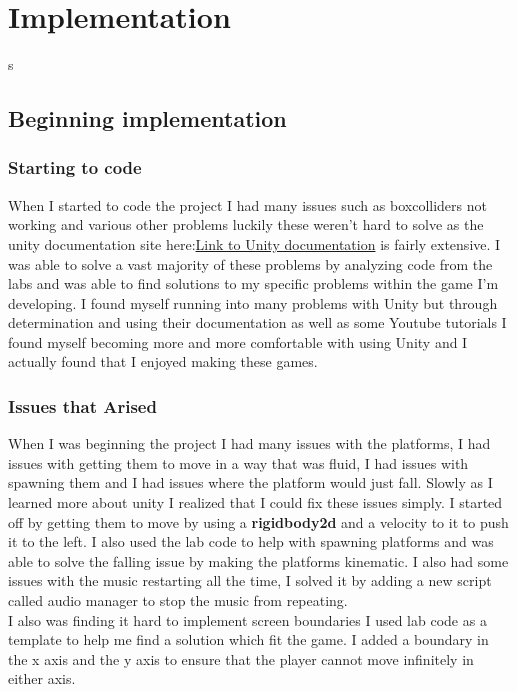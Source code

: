 \documentclass{report}
\begin{document}
\chapter{Implementation}s
\section{Beginning implementation}
\subsection{Starting to code}
When I started to code the project I had many issues such as boxcolliders not working and various other problems luckily these weren't  hard to solve as the unity documentation site here:\href{https://docs.unity3d.com/Manual/index.html}{Link to Unity documentation} is fairly extensive.  I was able to solve a vast majority of these problems by analyzing code from the labs and was able to find solutions to my specific problems within the game I'm developing.  I found myself running into many problems with Unity but through determination and using their documentation as well as some Youtube tutorials I found myself becoming more and more comfortable with using Unity and I actually found that I enjoyed making these games.
\subsection{Issues that Arised}
When I was beginning the project I had many issues with the platforms, I had issues with getting them to move in a way that was fluid, I had issues with spawning them and I had issues where the platform would just fall.  Slowly as I learned more about unity I realized that I could fix these issues simply. I started off by getting them to move by using a \textbf{rigidbody2d}\cite{RigidBody} and a velocity to it to push it to the left. I also used the lab code to help with spawning platforms and was able to solve the falling issue by making the platforms kinematic.  I also had some issues with the music restarting all the time, I solved it by adding a new script called audio manager to stop the music from repeating.
\\
I also was finding it hard to implement screen boundaries I used lab code as a template to help me find a solution which fit the game.  I added a boundary in the x axis and the y axis to ensure that the player cannot move infinitely in either axis.
\end{document}
